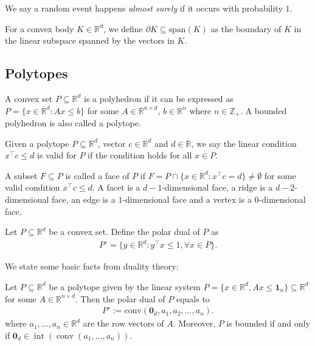 \documentclass{theoretics}
\newcommand{\R}{\mathbb R}
\newcommand{\conv}{\operatorname{conv}}
\renewcommand{\subset}{\subseteq}
\begin{document}
We say a random event happens \emph{almost surely} if it occurs with probability $1$.

For a convex body $K \in \R^d$,  we define $\partial K \subset \mathrm{span}(K)$ as the boundary of $K$ in the linear subspace spanned by the vectors in $K$.


\subsection{Polytopes}

\begin{definition}[Polytope]
    A convex set $P \subset \mathbb{R}^d$ is a polyhedron if it can be expressed as $P = \{x \in \mathbb{R}^d : A x \leq b\}$ for some $A \in \mathbb{R}^{n \times d}$, $b \in \mathbb{R}^n$ where $n \in \mathbb{Z}_+$.
    A bounded polyhedron is also called a polytope.
\end{definition}

\begin{definition}
    Given a polytope $P \subset \R^d$, vector $c\in \R^d$ and $d\in \R$, we say the linear condition $x^\top c \leq d$ is valid for $P$ if  the condition holds for all $x\in P$.
    
    A subset $F \subset P$ is called a face of $P$ if $F = P \cap \{x\in \R^d : x^\top c = d\} \neq \emptyset$ for some valid condition $x^\top c \leq d$.
    A facet is a $d-1$-dimensional face, a ridge is a $d-2$-dimensional face, an edge is a $1$-dimensional face and a vertex is a $0$-dimensional face.
\end{definition}

\begin{definition}\label{def:smooth_polar}
    Let $P \subset \R^d$ be a convex set. Define the polar dual of $P$ as 
    \begin{align*}
        P^\circ = \{y \in \R^d : y^\top x \leq 1, \forall x \in P\}.
    \end{align*}
\end{definition}

We state some basic facts from duality theory:
\begin{fact}
    Let $P \subset \R^d$ be a polytope given by the linear system $P=\{x\in \mathbb{R}^d, A x \le \mathbf{1}_n\} \subset \R^d$ for some $A\in \R^{n\times d}$. Then the polar dual of $P$ equals to
    \begin{align*}
        P^\circ := \mathrm{conv}(\mathbf{0}_d,a_1,a_2,\ldots,a_n).
    \end{align*}
    where $a_1, \ldots, a_n \in \R^d$ are the row vectors of $A$.
    Moreover, $P$ is bounded if and only if $\mathbf{0}_d \in \operatorname{int}(\conv(a_1, \ldots, a_n))$.
\end{fact}
\end{document}
